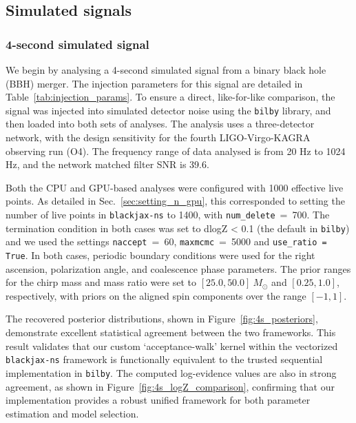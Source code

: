 \documentclass[fleqn,usenatbib]{mnras}
\begin{document}
\subsection{Simulated signals}

\subsubsection{4-second simulated signal}
\label{sec:4s_simulated_signal}

We begin by analysing a 4-second simulated signal from a binary black
hole (BBH) merger. The injection parameters for this signal are
detailed in Table~\ref{tab:injection_params}. To ensure a direct,
like-for-like comparison, the signal was injected into simulated
detector noise using the \texttt{bilby} library, and 
then loaded into both sets of analyses. The analysis
uses a three-detector network, with the design
sensitivity for the fourth LIGO-Virgo-KAGRA observing run (O4).
The frequency range of data analysed is from 20 Hz to 1024 Hz, 
and the network matched filter SNR is 39.6. 

Both the CPU and GPU-based analyses were configured with 1000 effective live
points. As detailed in Sec.~\ref{sec:setting_n_gpu}, this corresponded to
setting the number of live points in \texttt{blackjax-ns} to 1400, with \mbox{\texttt{num\_delete} = 700}.
The termination condition in both cases was set to dlogZ < 0.1 (the default in \texttt{bilby})
and we used the settings \mbox{\texttt{naccept} = 60}, \mbox{\texttt{maxmcmc} = 5000} and \mbox{\texttt{use\_ratio = True}}. 
In both cases, periodic boundary conditions were used for the right ascension, 
polarization angle, and coalescence phase parameters. The prior ranges
for the chirp mass and mass ratio were set to $[25.0, 50.0]~M_{\odot}$
and $[0.25, 1.0]$, respectively, with priors on the aligned
spin components over the range $[-1, 1]$. 

The recovered posterior distributions, shown in
Figure~\ref{fig:4s_posteriors}, demonstrate excellent statistical
agreement between the two frameworks. This result validates that our
custom `acceptance-walk' kernel within the vectorized \texttt{blackjax-ns}
framework is functionally equivalent to the trusted sequential
implementation in \texttt{bilby}. The computed log-evidence values are
also in strong agreement, as shown in Figure~\ref{fig:4s_logZ_comparison},
confirming that our implementation provides a robust unified framework for both
parameter estimation and model selection. 
\end{document}
